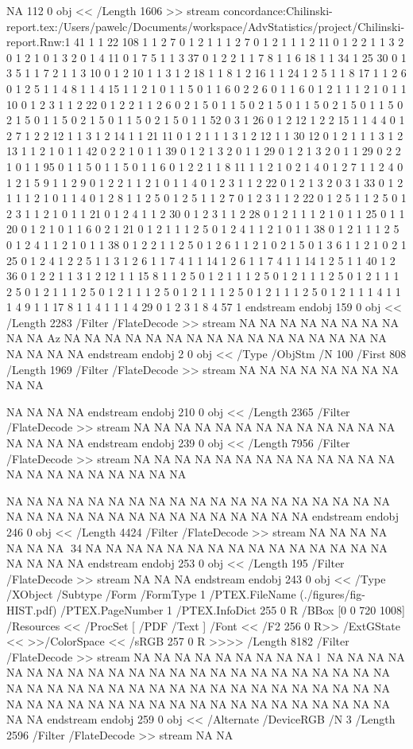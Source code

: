 NA
112 0 obj <<
/Length 1606      
>>
stream
concordance:Chilinski-report.tex:/Users/pawelc/Documents/workspace/AdvStatistics/project/Chilinski-report.Rnw:1 41 1 1 22 108 1 1 2 7 0 1 2 1 1 1 2 7 0 1 2 1 1 1 2 11 0 1 2 2 1 1 3 2 0 1 2 1 0 1 3 2 0 1 4 11 0 1 7 5 1 1 3 37 0 1 2 2 1 1 7 8 1 1 6 18 1 1 34 1 25 30 0 1 3 5 1 1 7 2 1 1 3 10 0 1 2 10 1 1 3 1 2 18 1 1 8 1 2 16 1 1 24 1 2 5 1 1 8 17 1 1 2 6 0 1 2 5 1 1 4 8 1 1 4 15 1 1 2 1 0 1 1 5 0 1 1 6 0 2 2 6 0 1 1 6 0 1 2 1 1 1 2 1 0 1 1 10 0 1 2 3 1 1 2 22 0 1 2 2 1 1 2 6 0 2 1 5 0 1 1 5 0 2 1 5 0 1 1 5 0 2 1 5 0 1 1 5 0 2 1 5 0 1 1 5 0 2 1 5 0 1 1 5 0 2 1 5 0 1 1 52 0 3 1 26 0 1 2 12 1 2 2 15 1 1 4 4 0 1 2 7 1 2 2 12 1 1 3 1 2 14 1 1 21 11 0 1 2 1 1 1 3 1 2 12 1 1 30 12 0 1 2 1 1 1 3 1 2 13 1 1 2 1 0 1 1 42 0 2 2 1 0 1 1 39 0 1 2 1 3 2 0 1 1 29 0 1 2 1 3 2 0 1 1 29 0 2 2 1 0 1 1 95 0 1 1 5 0 1 1 5 0 1 1 6 0 1 2 2 1 1 8 11 1 1 2 1 0 2 1 4 0 1 2 7 1 1 2 4 0 1 2 1 5 9 1 1 2 9 0 1 2 2 1 1 2 1 0 1 1 4 0 1 2 3 1 1 2 22 0 1 2 1 3 2 0 3 1 33 0 1 2 1 1 1 2 1 0 1 1 4 0 1 2 8 1 1 2 5 0 1 2 5 1 1 2 7 0 1 2 3 1 1 2 22 0 1 2 5 1 1 2 5 0 1 2 3 1 1 2 1 0 1 1 21 0 1 2 4 1 1 2 30 0 1 2 3 1 1 2 28 0 1 2 1 1 1 2 1 0 1 1 25 0 1 1 20 0 1 2 1 0 1 1 6 0 2 1 21 0 1 2 1 1 1 2 5 0 1 2 4 1 1 2 1 0 1 1 38 0 1 2 1 1 1 2 5 0 1 2 4 1 1 2 1 0 1 1 38 0 1 2 2 1 1 2 5 0 1 2 6 1 1 2 1 0 2 1 5 0 1 3 6 1 1 2 1 0 2 1 25 0 1 2 4 1 2 2 5 1 1 3 1 2 6 1 1 7 4 1 1 14 1 2 6 1 1 7 4 1 1 14 1 2 5 1 1 40 1 2 36 0 1 2 2 1 1 3 1 2 12 1 1 15 8 1 1 2 5 0 1 2 1 1 1 2 5 0 1 2 1 1 1 2 5 0 1 2 1 1 1 2 5 0 1 2 1 1 1 2 5 0 1 2 1 1 1 2 5 0 1 2 1 1 1 2 5 0 1 2 1 1 1 2 5 0 1 2 1 1 1 4 1 1 1 4 9 1 1 17 8 1 1 4 1 1 1 4 29 0 1 2 3 1 8 4 57 1
endstream
endobj
159 0 obj <<
/Length 2283      
/Filter /FlateDecode
>>
stream
NA
NA
NA
NA
NA
NA
NA
NA
NA
NA
Az
NA
NA
NA
NA
NA
NA
NA
NA
NA
NA
NA
NA
NA
NA
NA
NA
NA
NA
NA
NA
endstream
endobj
2 0 obj <<
/Type /ObjStm
/N 100
/First 808
/Length 1969      
/Filter /FlateDecode
>>
stream
NA
NA
NA
NA
NA
NA
NA
NA
NA
NA

NA
NA
NA
NA
endstream
endobj
210 0 obj <<
/Length 2365      
/Filter /FlateDecode
>>
stream
NA
NA
NA
NA
NA
NA
NA
NA
NA
NA
NA
NA
NA
NA
NA
NA
NA
endstream
endobj
239 0 obj <<
/Length 7956      
/Filter /FlateDecode
>>
stream
NA
NA
NA
NA
NA
NA
NA
NA
NA
NA
NA
NA
NA
NA
NA
NA
NA
NA
NA
NA
NA
NA

NA
NA
NA
NA
NA
NA
NA
NA
NA
NA
NA
NA
NA
NA
NA
NA
NA
NA
NA
NA
NA
NA
NA
NA
NA
NA
NA
NA
NA
NA
NA
NA
NA
NA
endstream
endobj
246 0 obj <<
/Length 4424      
/Filter /FlateDecode
>>
stream
NA
NA
NA
NA
NA
NA
NA
34
NA
NA
NA
NA
NA
NA
NA
NA
NA
NA
NA
NA
NA
NA
NA
NA
NA
NA
NA
endstream
endobj
253 0 obj <<
/Length 195       
/Filter /FlateDecode
>>
stream
NA
NA
NA
endstream
endobj
243 0 obj <<
/Type /XObject
/Subtype /Form
/FormType 1
/PTEX.FileName (./figures/fig-HIST.pdf)
/PTEX.PageNumber 1
/PTEX.InfoDict 255 0 R
/BBox [0 0 720 1008]
/Resources <<
/ProcSet [ /PDF /Text ]
/Font << /F2 256 0 R>>
/ExtGState <<
>>/ColorSpace <<
/sRGB 257 0 R
>>>>
/Length 8182
/Filter /FlateDecode
>>
stream
NA
NA
NA
NA
NA
NA
NA
NA
NA
l
NA
NA
NA
NA
NA
NA
NA
NA
NA
NA
NA
NA
NA
NA
NA
NA
NA
NA
NA
NA
NA
NA
NA
NA
NA
NA
NA
NA
NA
NA
NA
NA
NA
NA
NA
NA
NA
NA
NA
NA
NA
NA
NA
NA
NA
NA
NA
NA
NA
NA
NA
NA
NA
NA
NA
NA
NA
NA
NA
NA
NA
NA
NA
endstream
endobj
259 0 obj
<<
/Alternate /DeviceRGB
/N 3
/Length 2596
/Filter /FlateDecode
>>
stream
NA
NA

